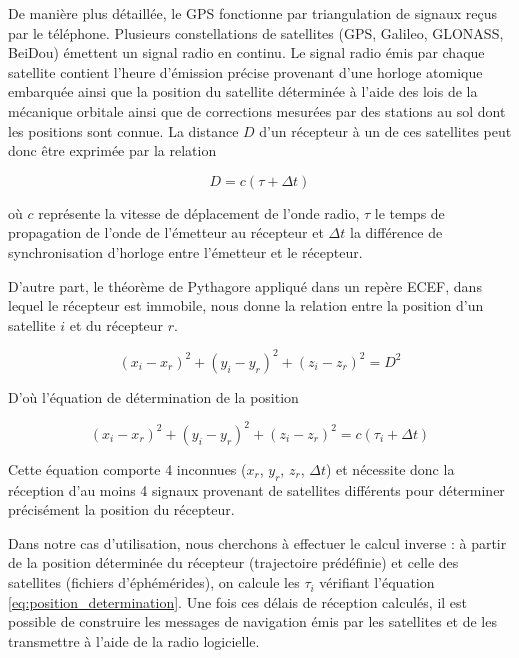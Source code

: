 \documentclass[runningheads]{llncs}
\begin{document}
De manière plus détaillée, le GPS fonctionne par triangulation de signaux reçus par le téléphone. Plusieurs constellations de satellites (GPS, Galileo, GLONASS, BeiDou) émettent un signal radio en continu. Le signal radio émis par chaque satellite contient l'heure d'émission précise provenant d'une horloge atomique embarquée ainsi que la position du satellite déterminée à l'aide des lois de la mécanique orbitale ainsi que de corrections mesurées par des stations au sol dont les positions sont connue. La distance $D$ d'un récepteur à un de ces satellites peut donc être exprimée par la relation

\begin{equation}
    D = c(\tau + \Delta t)
\end{equation}

où $c$ représente la vitesse de déplacement de l'onde radio, $\tau$ le temps de propagation de l'onde de l'émetteur au récepteur et $\Delta t$ la différence de synchronisation d'horloge entre l'émetteur et le récepteur.

D'autre part, le théorème de Pythagore appliqué dans un repère ECEF, dans lequel le récepteur est immobile, nous donne la relation entre la position d'un satellite $i$ et du récepteur $r$.

\begin{equation}
    (x_i - x_r)^2 + (y_i - y_r)^2 + (z_i - z_r)^2 = D^2
\end{equation}

D'où l'équation de détermination de la position

\begin{equation}
    (x_i - x_r)^2 + (y_i - y_r)^2 + (z_i - z_r)^2 = c(\tau_i + \Delta t)
    \label{eq:position_determination}
\end{equation}

Cette équation comporte 4 inconnues ($x_r$, $y_r$, $z_r$, $\Delta t$) et nécessite donc la réception d'au moins 4 signaux provenant de satellites différents pour déterminer précisément la position du récepteur. 

Dans notre cas d'utilisation, nous cherchons à effectuer le calcul inverse : à partir de la position déterminée du récepteur (trajectoire prédéfinie) et celle des satellites (fichiers d'éphémérides), on calcule les $\tau_i$ vérifiant l'équation \ref{eq:position_determination}. Une fois ces délais de réception calculés, il est possible de construire les messages de navigation émis par les satellites et de les transmettre à l'aide de la radio logicielle.
\end{document}
